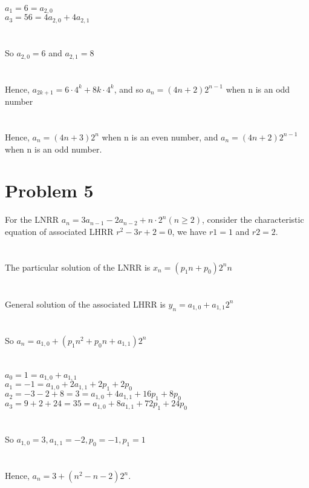 \documentclass{article}
\begin{document}
$a_1 = 6 = a_{2,0}$\\
$a_3 = 56 = 4a_{2,0} + 4a_{2,1}$\\
\\ \hspace*{\fill} \\
So $a_{2,0} = 6$ and $a_{2,1} = 8$\\
\\ \hspace*{\fill} \\
Hence, $a_{2k+1} = 6 \cdot 4^k + 8k \cdot 4^k$, and so $a_n = (4n + 2) 2^{n-1}$ when n is an odd number\\
\\ \hspace*{\fill} \\
Hence, $a_n = (4n + 3) 2^n$ when n is an even number, and $a_n = (4n + 2) 2^{n-1}$ when n is an odd number.
\newpage
\section{Problem 5}
For the LNRR $a_n = 3a_{n-1} - 2a_{n-2} + n \cdot 2^n (n \geq 2)$, consider the characteristic equation of associated LHRR $r^2 - 3r + 2 = 0$, we have $r1 = 1$ and $r2 = 2$.\\
\\ \hspace*{\fill} \\
The particular solution of the LNRR is $x_n = (p_1n + p_0) 2^n n$\\
\\ \hspace*{\fill} \\
General solution of the associated LHRR is $y_n = a_{1,0} + a_{1,1}2^n$\\
\\ \hspace*{\fill} \\
So $a_n = a_{1,0} + (p_1n^2 + p_0n + a_{1,1}) 2^n$\\
\\ \hspace*{\fill} \\
$a_0 = 1 = a_{1,0} + a_{1,1}$\\
$a_1 = -1 = a_{1,0} + 2a_{1,1} + 2p_1 + 2p_0$\\
$a_2 = -3 - 2 + 8 = 3 = a_{1,0} + 4a_{1,1} + 16p_1 + 8p_0$\\
$a_3 = 9 + 2 + 24 = 35 = a_{1,0} + 8a_{1,1} + 72p_1 + 24p_0$\\
\\ \hspace*{\fill} \\
So $a_{1,0} = 3, a_{1,1} = -2, p_0 = -1, p_1 = 1$\\
\\ \hspace*{\fill} \\
Hence, $a_n = 3 + (n^2 - n - 2)2^n$.
\newpage
\end{document}

